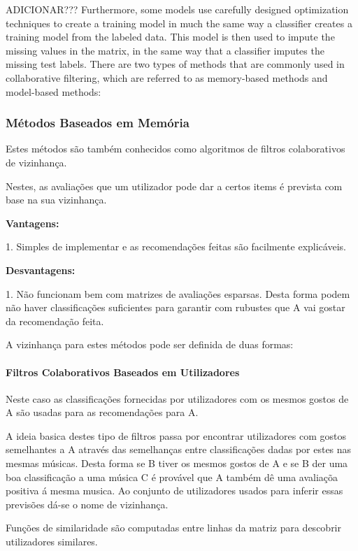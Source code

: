 ADICIONAR???
Furthermore, some models use carefully designed optimization techniques to create a training model in much the same way a classifier creates a training model from the labeled data. This model is then used to impute the missing values in the matrix, in the same way that a classifier imputes the missing test labels. There are two types of methods that are commonly used in collaborative filtering, which are referred to as memory-based methods and model-based methods:
\hfill
\subsubsection{ Métodos Baseados em Memória}
\hfill
 \par Estes métodos são também conhecidos como algoritmos de filtros colaborativos de vizinhança.
 \par Nestes, as avaliações que um utilizador pode dar a certos items é prevista com base na sua vizinhança.\newline


\textbf{Vantagens:}\hfill
\hfill
\par 1. Simples de implementar e as recomendações feitas são facilmente explicáveis.\newline


\textbf{Desvantagens:}\hfill
\hfill
\par 1. Não funcionam bem com matrizes de avaliações esparsas. Desta forma podem não haver classificações suficientes para garantir com rubustes que A vai gostar da recomendação feita.\newline


\par A vizinhança para estes métodos pode ser definida de duas formas:

\hfill
\paragraph{ Filtros Colaborativos Baseados em Utilizadores}
\hfill
 \par Neste caso as classificações fornecidas por utilizadores com os mesmos gostos de A são usadas para as recomendações para A. 
 \par A ideia basica destes tipo de filtros passa por encontrar utilizadores com gostos semelhantes a A através das semelhanças entre classificações dadas por estes nas mesmas músicas. Desta forma se B tiver os mesmos gostos de A e se B der uma boa classificação a uma música C é provável que A também dê uma avaliaçõa positiva á mesma musica. Ao conjunto de utilizadores usados para inferir essas previsões dá-se o nome de vizinhança.
 \par Funções de similaridade são computadas entre linhas da matriz para descobrir utilizadores similares.


